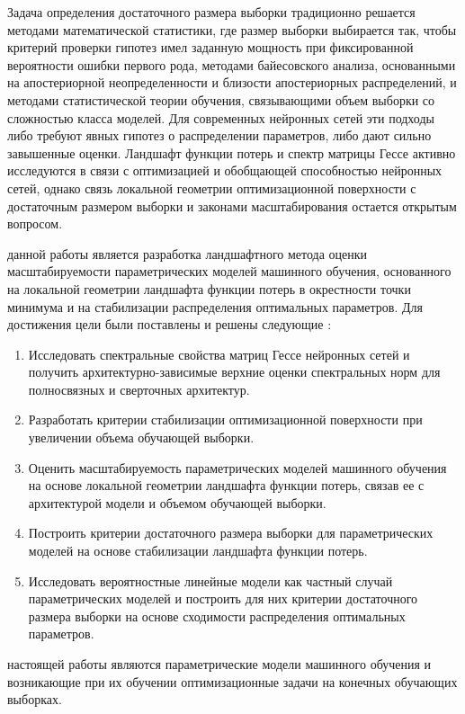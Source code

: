 \ifsynopsis
{\progress} Задача определения достаточного размера выборки традиционно решается методами математической статистики, где размер выборки выбирается так, чтобы критерий проверки гипотез имел заданную мощность при фиксированной вероятности ошибки первого рода, методами байесовского анализа, основанными на апостериорной неопределенности и близости апостериорных распределений, и методами статистической теории обучения, связывающими объем выборки со сложностью класса моделей. Для современных нейронных сетей эти подходы либо требуют явных гипотез о распределении параметров, либо дают сильно завышенные оценки. Ландшафт функции потерь и спектр матрицы Гессе активно исследуются в связи с оптимизацией и обобщающей способностью нейронных сетей, однако связь локальной геометрии оптимизационной поверхности с достаточным размером выборки и законами масштабирования остается открытым вопросом.
\else

\fi

{\aim} данной работы является разработка ландшафтного метода оценки масштабируемости параметрических моделей машинного обучения, основанного на локальной геометрии ландшафта функции потерь в окрестности точки минимума и на стабилизации распределения оптимальных параметров. Для достижения цели были поставлены и решены следующие {\tasks}:

\begin{enumerate}[beginpenalty=10000]
    \item Исследовать спектральные свойства матриц Гессе нейронных сетей и получить архитектурно-зависимые верхние оценки спектральных норм для полносвязных и сверточных архитектур.
    \item Разработать критерии стабилизации оптимизационной поверхности при увеличении объема обучающей выборки.
    \item Оценить масштабируемость параметрических моделей машинного обучения на основе локальной геометрии ландшафта функции потерь, связав ее с архитектурой модели и объемом обучающей выборки.
    \item Построить критерии достаточного размера выборки для параметрических моделей на основе стабилизации ландшафта функции потерь.
    \item Исследовать вероятностные линейные модели как частный случай параметрических моделей и построить для них критерии достаточного размера выборки на основе сходимости распределения оптимальных параметров.
\end{enumerate}

{\object} настоящей работы являются параметрические модели машинного обучения и возникающие при их обучении оптимизационные задачи на конечных обучающих выборках.

